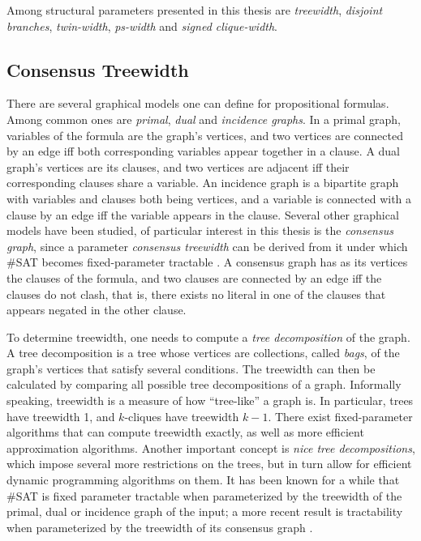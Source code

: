 \documentclass{article}
\begin{document}
Among structural parameters presented in this thesis are {\em treewidth}, {\em disjoint branches}, {\em twin-width}, {\em ps-width} and {\em signed clique-width}.

\subsection{Consensus Treewidth}

There are several graphical models one can define for propositional formulas.
Among common ones are {\em primal}, {\em dual} and {\em incidence graphs}.
In a primal graph, variables of the formula are the graph's vertices, and two vertices are connected by an edge iff both corresponding variables appear together in a clause.
A dual graph's vertices are its clauses, and two vertices are adjacent iff their corresponding clauses share a variable.
An incidence graph is a bipartite graph with variables and clauses both being vertices, and a variable is connected with a clause by an edge iff the variable appears in the clause.
Several other graphical models have been studied, of particular interest in this thesis is the {\em consensus graph}, since a parameter {\em consensus treewidth} can be derived from it under which \#SAT becomes fixed-parameter tractable \cite{DBLP:conf/sat/GanianS17}.
A consensus graph has as its vertices the clauses of the formula, and two clauses are connected by an edge iff the clauses do not clash, that is, there exists no literal in one of the clauses that appears negated in the other clause.

To determine treewidth, one needs to compute a {\em tree decomposition} of the graph.
A tree decomposition is a tree whose vertices are collections, called {\em bags}, of the graph's vertices that satisfy several conditions.
The treewidth can then be calculated by comparing all possible tree decompositions of a graph.
Informally speaking, treewidth is a measure of how ``tree-like'' a graph is.
In particular, trees have treewidth 1, and $k$-cliques have treewidth $k-1$.
There exist fixed-parameter algorithms that can compute treewidth exactly, as well as more efficient approximation algorithms.
Another important concept is {\em nice tree decompositions}, which impose several more restrictions on the trees, but in turn allow for efficient dynamic programming algorithms on them.
It has been known for a while that \#SAT is fixed parameter tractable when parameterized by the treewidth of the primal, dual or incidence graph of the input; a more recent result is tractability when parameterized by the treewidth of its consensus graph \cite{DBLP:conf/sat/GanianS17}.
\end{document}
